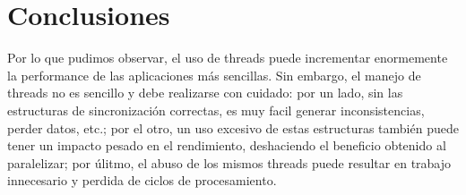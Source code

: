 \section{Conclusiones}

Por lo que pudimos observar, el uso de threads puede incrementar enormemente la performance de las aplicaciones más sencillas. Sin embargo, el manejo de threads no es sencillo y debe realizarse con cuidado: por un lado, sin las estructuras de sincronización correctas, es muy facil generar inconsistencias, perder datos, etc.; por el otro, un uso excesivo de estas estructuras también puede tener un impacto pesado en el rendimiento, deshaciendo el beneficio obtenido al paralelizar; por úlitmo, el abuso de los mismos threads puede resultar en trabajo innecesario y perdida de ciclos de procesamiento.
